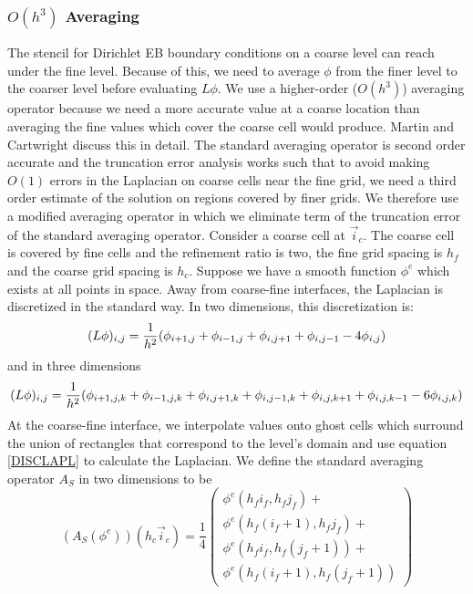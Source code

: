 \subsubsection{$O(h^3)$ Averaging } 
\label{sec::hoave}

The stencil for Dirichlet EB boundary conditions on a coarse level can
reach under the fine level.
Because of this, we need to average $\phi$ from the finer level to the
coarser level before evaluating $L\phi$.
We use a higher-order ($O(h^3)$) averaging operator because we
need a more accurate value at a coarse location than averaging
the fine values which cover the coarse cell would produce.  Martin
and Cartwright discuss this in detail. 
The standard averaging operator is second order accurate and the
truncation error analysis works such that to avoid making $O(1)$
errors in the Laplacian on coarse cells near the fine grid, we need a third order
estimate of the solution on regions covered by finer grids.  We
therefore use a  modified averaging operator in which we eliminate
term of the truncation error of the standard averaging operator.
Consider a coarse cell at $\vec i_c$. 
The coarse cell is covered by fine cells and the refinement ratio is
two, the fine grid spacing is $h_f$ and the coarse grid spacing is 
$h_c$.  
Suppose we have a smooth function $\phi^e$ which exists at all
points in space.
Away from coarse-fine interfaces, the Laplacian is discretized in the
standard way.  In two dimensions, this discretization is:
\begin{equation}
(L\phi)_{i ,j } = \frac{1}{h^2}
    (\phi_{i+1,j}+\phi_{i-1,j}+\phi_{i,j+1}+\phi_{i,j-1}-4\phi_{i ,j })
\label{DISCLAPL}
\end{equation}
and in three dimensions
\begin{equation}
(L\phi)_{i ,j } = \frac{1}{h^2}
       (\phi_{i+1,j,k}+\phi_{i-1,j,k}+
        \phi_{i,j+1,k}+\phi_{i,j-1,k}+
        \phi_{i,j,k+1}+\phi_{i,j,k-1}-6\phi_{i,j,k})
\label{DISCLAPL3D}
\end{equation}
At the coarse-fine interface, we interpolate values onto ghost cells
which surround the union of rectangles that correspond to the level's
domain and use equation \ref{DISCLAPL} to calculate the Laplacian. 
We define the standard averaging operator $A_{S}$ in two 
dimensions to be
\begin{equation}        
(A_S(\phi^e))(h_c \vec i_c) = \frac{1}{4}\left( \begin{array}{ll}
\phi^e(h_f i_f   ,h_f j_f) + \\
\phi^e(h_f(i_f+1),h_f j_f) + \\ 
\phi^e(h_f i_f   ,h_f(j_f+1)) + \\
\phi^e(h_f(i_f+1),h_f(j_f+1))
\end{array} \right)
\end{equation}
